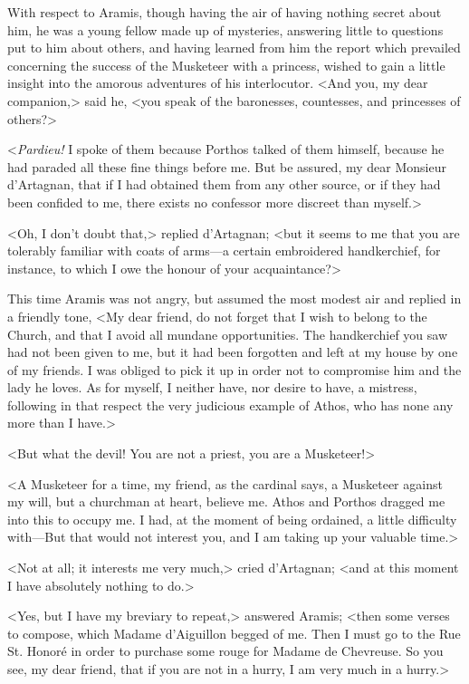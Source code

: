 With respect to Aramis, though having the air of having nothing secret about him, he was a young fellow made up of mysteries, answering little to questions put to him about others, and having learned from him the report which prevailed concerning the success of the Musketeer with a princess, wished to gain a little insight into the amorous adventures of his interlocutor. <And you, my dear companion,> said he, <you speak of the baronesses, countesses, and princesses of others?> 

<\textit{Pardieu!} I spoke of them because Porthos talked of them himself, because he had paraded all these fine things before me. But be assured, my dear Monsieur d'Artagnan, that if I had obtained them from any other source, or if they had been confided to me, there exists no confessor more discreet than myself.> 

<Oh, I don't doubt that,> replied d'Artagnan; <but it seems to me that you are tolerably familiar with coats of arms---a certain embroidered handkerchief, for instance, to which I owe the honour of your acquaintance?> 

This time Aramis was not angry, but assumed the most modest air and replied in a friendly tone, <My dear friend, do not forget that I wish to belong to the Church, and that I avoid all mundane opportunities. The handkerchief you saw had not been given to me, but it had been forgotten and left at my house by one of my friends. I was obliged to pick it up in order not to compromise him and the lady he loves. As for myself, I neither have, nor desire to have, a mistress, following in that respect the very judicious example of Athos, who has none any more than I have.> 

<But what the devil! You are not a priest, you are a Musketeer!> 

<A Musketeer for a time, my friend, as the cardinal says, a Musketeer against my will, but a churchman at heart, believe me. Athos and Porthos dragged me into this to occupy me. I had, at the moment of being ordained, a little difficulty with---But that would not interest you, and I am taking up your valuable time.> 

<Not at all; it interests me very much,> cried d'Artagnan; <and at this moment I have absolutely nothing to do.> 

<Yes, but I have my breviary to repeat,> answered Aramis; <then some verses to compose, which Madame d'Aiguillon begged of me. Then I must go to the Rue St. Honoré in order to purchase some rouge for Madame de Chevreuse. So you see, my dear friend, that if you are not in a hurry, I am very much in a hurry.> 

